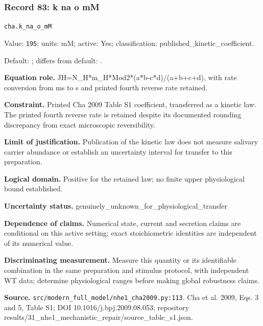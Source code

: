 \subsubsection*{Record 83: k na o mM}
{\small \nolinkurl{cha.k_na_o_mM}\par

Value: \texttt{195}; units: mM; active: Yes; classification: published\_kinetic\_coefficient.\par

Default: ; differs from default: .\par

\textbf{Equation role.} JH=N\_H*m\_H*Mod2*(a*b-c*d)/(a+b+c+d), with rate conversion from ms to s and printed fourth reverse rate retained.\par

\textbf{Constraint.} Printed Cha 2009 Table S1 coefficient, transferred as a kinetic law. The printed fourth reverse rate is retained despite its documented rounding discrepancy from exact microscopic reversibility.\par

\textbf{Limit of justification.} Publication of the kinetic law does not measure salivary carrier abundance or establish an uncertainty interval for transfer to this preparation.\par

\textbf{Logical domain.} Positive for the retained law; no finite upper physiological bound established.\par

\textbf{Uncertainty status.} genuinely\_unknown\_for\_physiological\_transfer\par

\textbf{Dependence of claims.} Numerical state, current and secretion claims are conditional on this active setting; exact stoichiometric identities are independent of its numerical value.\par

\textbf{Discriminating measurement.} Measure this quantity or its identifiable combination in the same preparation and stimulus protocol, with independent WT data; determine physiological ranges before making global robustness claims.\par

\textbf{Source.} \nolinkurl{src/modern_full_model/nhe1_cha2009.py:113}. Cha et al. 2009, Eqs. 3 and 5, Table S1; DOI 10.1016/j.bpj.2009.08.053; repository results/31\_nhe1\_mechanistic\_repair/source\_table\_s1.json.\par}


